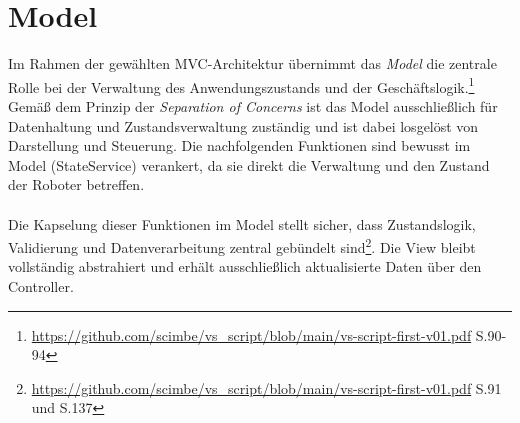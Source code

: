 \section{Model}
Im Rahmen der gewählten MVC-Architektur übernimmt das \textit{Model} die zentrale Rolle bei der Verwaltung des Anwendungszustands und der Geschäftslogik.\footnote{\url{https://github.com/scimbe/vs_script/blob/main/vs-script-first-v01.pdf} S.90-94}
Gemäß dem Prinzip der \textit{Separation of Concerns} ist das Model ausschließlich für Datenhaltung und Zustandsverwaltung zuständig und ist dabei losgelöst von Darstellung und Steuerung. 
Die nachfolgenden Funktionen sind bewusst im Model (StateService) verankert, da sie direkt die Verwaltung und den Zustand der Roboter betreffen.
\\\\%
Die Kapselung dieser Funktionen im Model stellt sicher, dass Zustandslogik, Validierung und Datenverarbeitung zentral gebündelt sind\footnote{\url{https://github.com/scimbe/vs_script/blob/main/vs-script-first-v01.pdf} S.91 und S.137}.
Die View bleibt vollständig abstrahiert und erhält ausschließlich aktualisierte Daten über den Controller. 

